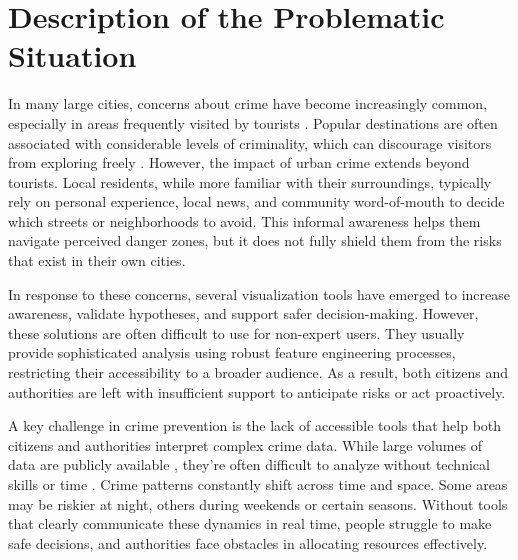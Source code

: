\section{Description of the Problematic Situation}

In many large cities, concerns about crime have become increasingly common, especially in areas frequently visited by tourists \cite{SopikoTevdoradze2024CrimeTourism}. Popular destinations are often associated with considerable levels of criminality, which can discourage visitors from exploring freely \cite{Machado2012CrimeRJ}. However, the impact of urban crime extends beyond tourists. Local residents, while more familiar with their surroundings, typically rely on personal experience, local news, and community word-of-mouth to decide which streets or neighborhoods to avoid. This informal awareness helps them navigate perceived danger zones, but it does not fully shield them from the risks that exist in their own cities.


In response to these concerns, several visualization tools \cite{Garcia2022CriPAV, Salah2022BigCDVis, Silva2017CrimeVisAI, Garcia2020MiranteAV, Garcia2021CrimAnalyzer} have emerged to increase awareness, validate hypotheses, and support safer decision-making. However, these solutions are often difficult to use for non-expert users. They usually provide sophisticated analysis using robust feature engineering processes, restricting their accessibility to a broader audience. As a result, both citizens and authorities are left with insufficient support to anticipate risks or act proactively.

A key challenge in crime prevention is the lack of accessible tools that help both citizens and authorities interpret complex crime data. While large volumes of data are publicly available \cite{Zhang2025CrimeDatasetChina, NYCDataset, ChicagoDataset}, they're often difficult to analyze without technical skills or time \cite{Zengli2020CrimePatterns}. Crime patterns constantly shift across time and space. Some areas may be riskier at night, others during weekends or certain seasons. Without tools that clearly communicate these dynamics in real time, people struggle to make safe decisions, and authorities face obstacles in allocating resources effectively.

